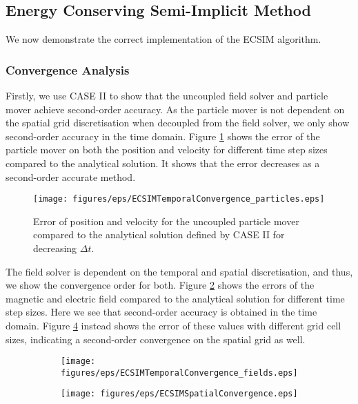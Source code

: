 \subsection{Energy Conserving Semi-Implicit Method}
We now demonstrate the correct implementation of the ECSIM algorithm. 
\subsubsection{Convergence Analysis}
\label{sub: convergence ecsim}
Firstly, we use CASE II to show that the uncoupled field solver and particle mover achieve second-order accuracy. As the particle mover is not dependent on the spatial grid discretisation when decoupled from the field solver, we only show second-order accuracy in the time domain. Figure \ref{fig: ecsim-convergence-posvel-time} shows the error of the particle mover on both the position and velocity for different time step sizes compared to the analytical solution. It shows that the error decreases as a second-order accurate method.

\begin{figure}[h]
    \centering
    \texttt{[image: figures/eps/ECSIMTemporalConvergence\_particles.eps]}
    \caption{Error of position and velocity for the uncoupled particle mover compared to the analytical solution defined by CASE II for decreasing $\Delta t$.}
    \label{fig: ecsim-convergence-posvel-time}
\end{figure}

The field solver is dependent on the temporal and spatial discretisation, and thus, we show the convergence order for both. 
Figure \ref{fig: ecsim-convergence-elmag-time} shows the errors of the magnetic and electric field compared to the analytical solution for different time step sizes. Here we see that second-order accuracy is obtained in the time domain. Figure \ref{fig: ecsim-convergence-elmag-space} instead shows the error of these values with different grid cell sizes, indicating a second-order convergence on the spatial grid as well.
\begin{figure}[h]
\begin{subfigure}{0.49\linewidth}
  \texttt{[image: figures/eps/ECSIMTemporalConvergence\_fields.eps]}
  \label{fig: ecsim-convergence-elmag-time}  
\end{subfigure}
\hfill
\begin{subfigure}{0.49\linewidth}
  \texttt{[image: figures/eps/ECSIMSpatialConvergence.eps]}
  \label{fig: ecsim-convergence-elmag-space}
\end{subfigure}
\end{figure}

